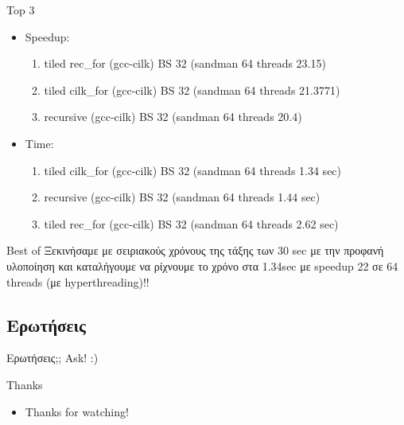 \documentclass{beamer}
\begin{document}
\begin{frame}
    \begin{block}{Top 3}
    \begin{itemize}
        \item<1-> Speedup:
            \begin{enumerate}
                \item<2-> tiled rec\_for (gcc-cilk) BS 32 (sandman 64 threads 23.15)
                \item<3-> tiled cilk\_for (gcc-cilk) BS 32 (sandman 64 threads 21.3771)
                \item<4-> recursive (gcc-cilk) BS 32 (sandman 64 threads 20.4)
            \end{enumerate}
        \item<5-> Time:
            \begin{enumerate}
                \item<6-> tiled cilk\_for (gcc-cilk) BS 32 (sandman 64 threads 1.34 sec)
                \item<7-> recursive (gcc-cilk) BS 32 (sandman 64 threads 1.44 sec)
                \item<8-> tiled rec\_for (gcc-cilk) BS 32 (sandman 64 threads 2.62 sec)
            \end{enumerate}
    \end{itemize}
    \end{block}
\end{frame}

\begin{frame}
    \begin{block}{Best of}
        Ξεκινήσαμε με σειριακούς χρόνους της τάξης των 30 sec με την προφανή
        υλοποίηση και καταλήγουμε να ρίχνουμε το χρόνο στα 1.34sec με speedup
        22 σε 64 threads (με hyperthreading)!! \smiley{}
    \end{block}
\end{frame}


\subsection{Ερωτήσεις}
\begin{frame}{Ερωτήσεις;;}
    Ask! :)
\end{frame}

\begin{frame}{Thanks}
    \begin{itemize}
        \item Thanks for watching!
    \end{itemize}
\end{frame}
\end{document}
